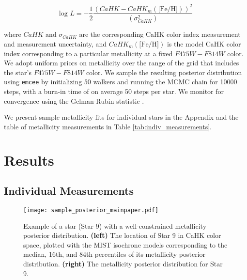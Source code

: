 \documentclass[twocolumn]{aastex63}
\begin{document}
\begin{equation}
    \mbox{log }L = -\frac{1}{2} \frac{(CaHK - CaHK_m(\mbox{[Fe/H]}))^2}{(\sigma_{CaHK} ^ 2)}
\end{equation}

where $CaHK$ and $\sigma_{CaHK}$ are the corresponding CaHK color index measurement and measurement uncertainty, and $CaHK_m(\mbox{[Fe/H]})$ is the model CaHK color index corresponding to a particular metallicity at a fixed $F475W - F814W$ color. We adopt uniform priors on metallicity over the range of the grid that includes the star's $F475W-F814W$ color. We sample the resulting posterior distribution using \texttt{emcee} \citep{emcee} by initializing 50 walkers and running the MCMC chain for 10000 steps, with a burn-in time of on average 50 steps per star. We monitor for convergence using the Gelman-Rubin statistic \citep{gelmanrubin1992}.

\par We present sample metallicity fits for individual stars in the Appendix and the table of metallicity measurements in Table \ref{tab:indiv_measurements}. 

\section{Results}
\label{sec:results}

\subsection{Individual Measurements}
\label{sec:resultsindiv}

\begin{figure}
    \centering
    \texttt{[image: sample\_posterior\_mainpaper.pdf]}
    \caption{Example of a star (Star 9) with a well-constrained metallicity posterior distribution. \textbf{(left)} The location of Star 9 in CaHK color space, plotted with the MIST isochrone models corresponding to the median, 16th, and 84th percentiles of its metallicity posterior distribution. \textbf{(right)} The metallicity posterior distribution for Star 9.}
    \label{fig:sample_posterior_main}
\end{figure}
\end{document}
